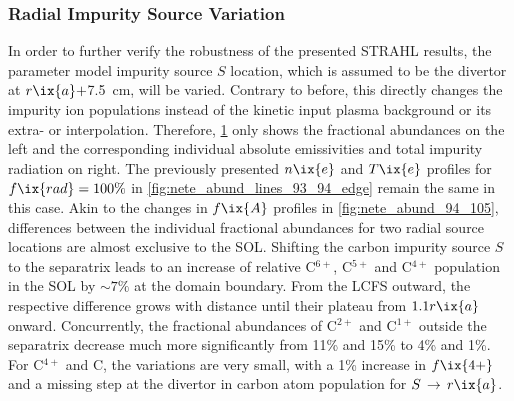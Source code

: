         \subsubsection*{Radial Impurity Source Variation}%
%
            \begin{figure}[t]%
                \centering%
                \begin{minipage}[b]{0.48\textwidth}%
                    \centering%
                \end{minipage}%
                \hfill%
                \begin{minipage}[b]{0.48\textwidth}%
                    \centering%
                \end{minipage}%
                \label{fig:fract_abund_rad_total_82_94}%
            \end{figure}%
%
            In order to further verify the robustness of the presented STRAHL results, the parameter model impurity source $S$ location, which is assumed to be the divertor at $r\ix{a}+$\SI{7.5}{\centi\meter}, will be varied. Contrary to before, this directly changes the impurity ion populations instead of the kinetic input plasma background or its extra- or interpolation. Therefore, \cref{fig:fract_abund_rad_total_82_94} only shows the fractional abundances on the left and the corresponding individual absolute emissivities and total impurity radiation on right. The previously presented $n\ix{e}$ and $T\ix{e}$ profiles for $f\ix{rad}=100\%$ in \cref{fig:nete_abund_lines_93_94_edge} remain the same in this case. Akin to the changes in $f\ix{A}$ profiles in \cref{fig:nete_abund_94_105}, differences between the individual fractional abundances for two radial source locations are almost exclusive to the SOL. Shifting the carbon impurity source $S$ to the separatrix leads to an increase of relative C$^{6+}$, C$^{5+}$ and C$^{4+}$ population in the SOL by $\sim7\%$ at the domain boundary. From the LCFS outward, the respective difference grows with distance until their plateau from $1.1r\ix{a}$ onward. Concurrently, the fractional abundances of C$^{2+}$ and C$^{1+}$ outside the separatrix decrease much more significantly from 11\% and 15\% to 4\% and 1\%. For C$^{4+}$ and C, the variations are very small, with a 1\% increase in $f\ix{4+}$ and a missing step at the divertor in carbon atom population for $S\,\rightarrow\,r\ix{a}$.\\%
